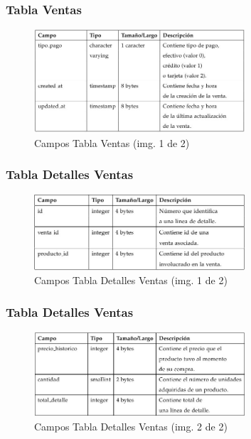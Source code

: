 \documentclass{beamer}
\begin{document}
\begin{frame}
\frametitle{Tabla Ventas}
\begin{figure}
\includegraphics[width=0.7\textwidth]{images/tabla_ventas2.jpg}
\caption{Campos Tabla Ventas \tiny{(img. 1 de 2)}}
\end{figure}
\end{frame}

\begin{frame}
\frametitle{Tabla Detalles Ventas}
\begin{figure}
\includegraphics[width=0.7\textwidth]{images/tabla_detalles_ventas1.jpg}
\caption{Campos Tabla Detalles Ventas \tiny{(img. 1 de 2)}}
\end{figure}
\end{frame}

\begin{frame}
\frametitle{Tabla Detalles Ventas}
\begin{figure}
\includegraphics[width=0.7\textwidth]{images/tabla_detalles_ventas2.jpg}
\caption{Campos Tabla Detalles Ventas \tiny{(img. 2 de 2)}}
\end{figure}
\end{frame}
\end{document}
